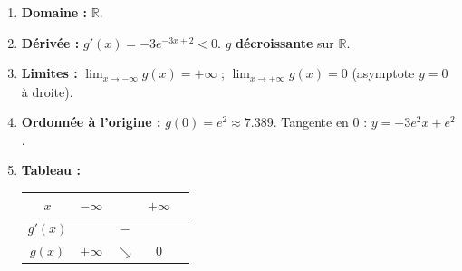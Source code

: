 \documentclass[11pt]{article}
\begin{document}
\begin{corrige}[Exercice n°2 : $g(x) = e^{-3x+2}$]
\begin{enumerate}
    \item \textbf{Domaine :} $\mathbb{R}$.
    \item \textbf{Dérivée :} $g'(x) = -3 e^{-3x+2} < 0$. $g$ \textbf{décroissante} sur $\mathbb{R}$.
    \item \textbf{Limites :} $\lim_{x\to -\infty} g(x) = +\infty$ ; $\lim_{x\to +\infty} g(x) = 0$ (asymptote $y=0$ à droite).
    \item \textbf{Ordonnée à l'origine :} $g(0) = e^2 \approx \num{7,389}$. Tangente en 0 : $y = -3e^2 x + e^2$.
    \item \textbf{Tableau :}
    \begin{center}
    \begin{tabular}{|c|cccc|}\hline
    $x$ & $-\infty$ & & $+\infty$ & \\ \hline
    $g'(x)$ & & $-$ & & \\ \hline
    $g(x)$ & $+\infty$ & $\searrow$ & $0$ & \\ \hline
    \end{tabular}
    \end{center}
\end{enumerate}
\end{corrige}
\end{document}
